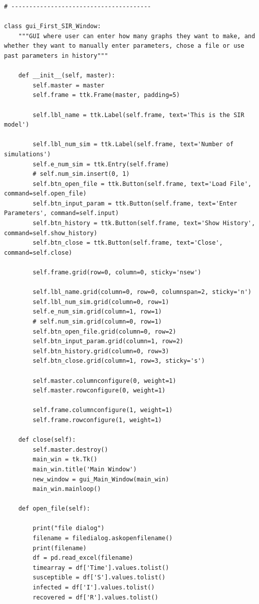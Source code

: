 \documentclass[11pt, a4paper]{article}
\begin{document}
\begin{lstlisting}
# ---------------------------------------

class gui_First_SIR_Window:
    """GUI where user can enter how many graphs they want to make, and whether they want to manually enter parameters, chose a file or use past parameters in history"""

    def __init__(self, master):
        self.master = master
        self.frame = ttk.Frame(master, padding=5)

        self.lbl_name = ttk.Label(self.frame, text='This is the SIR model')

        self.lbl_num_sim = ttk.Label(self.frame, text='Number of simulations')
        self.e_num_sim = ttk.Entry(self.frame)
        # self.num_sim.insert(0, 1)
        self.btn_open_file = ttk.Button(self.frame, text='Load File', command=self.open_file)
        self.btn_input_param = ttk.Button(self.frame, text='Enter Parameters', command=self.input)
        self.btn_history = ttk.Button(self.frame, text='Show History', command=self.show_history)
        self.btn_close = ttk.Button(self.frame, text='Close', command=self.close)

        self.frame.grid(row=0, column=0, sticky='nsew')

        self.lbl_name.grid(column=0, row=0, columnspan=2, sticky='n')
        self.lbl_num_sim.grid(column=0, row=1)
        self.e_num_sim.grid(column=1, row=1)
        # self.num_sim.grid(column=0, row=1)
        self.btn_open_file.grid(column=0, row=2)
        self.btn_input_param.grid(column=1, row=2)
        self.btn_history.grid(column=0, row=3)
        self.btn_close.grid(column=1, row=3, sticky='s')

        self.master.columnconfigure(0, weight=1)
        self.master.rowconfigure(0, weight=1)

        self.frame.columnconfigure(1, weight=1)
        self.frame.rowconfigure(1, weight=1)

    def close(self):
        self.master.destroy()
        main_win = tk.Tk()
        main_win.title('Main Window')
        new_window = gui_Main_Window(main_win)
        main_win.mainloop()

    def open_file(self):

        print("file dialog")
        filename = filedialog.askopenfilename()
        print(filename)
        df = pd.read_excel(filename)
        timearray = df['Time'].values.tolist()
        susceptible = df['S'].values.tolist()
        infected = df['I'].values.tolist()
        recovered = df['R'].values.tolist()


\end{lstlisting}
\end{document}
